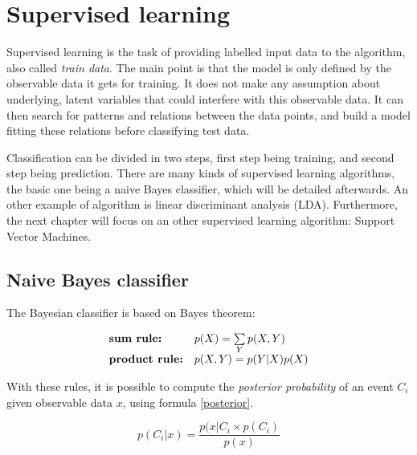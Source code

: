 \section{Supervised learning}

\vspace{\baselineskip}
\noindent Supervised learning is the task of providing labelled input data to the algorithm, also called \textit{train data}. The main point is that the model is only defined by the observable data it gets for training. It does not make any assumption about underlying, latent variables that could interfere with this observable data. It can then search for patterns and relations between the data points, and build a model fitting these relations before classifying test data.
\newline

\noindent Classification can be divided in two steps, first step being training, and second step being prediction. There are many kinds of supervised learning algorithms, the basic one being a naive Bayes classifier, which will be detailed afterwards. An other example of algorithm is linear discriminant analysis (LDA). Furthermore, the next chapter will focus on an other supervised learning algorithm: Support Vector Machines.
\newline

\subsection{Naive Bayes classifier}

\vspace{\baselineskip}
\noindent The Bayesian classifier is based on Bayes theorem:
\newline

\begin{equation}
    \begin{array}{ll}
        \text{\textbf{sum rule: }} & p(X) = \sum\limits_{Y} p(X,Y) \\
        \text{\textbf{product rule:}} & p(X,Y) = p(Y|X)p(X)
    \end{array}
    \label{bayes}
\end{equation}

\vspace{\baselineskip}
\noindent With these rules, it is possible to compute the \textit{posterior probability} of an event $C_i$ given observable data $x$, using formula \ref{posterior}.

\begin{equation}
	p(C_i|x) = \frac{p(x|C_i \times p(C_i)}{p(x)}
	\label{posterior}
\end{equation}

